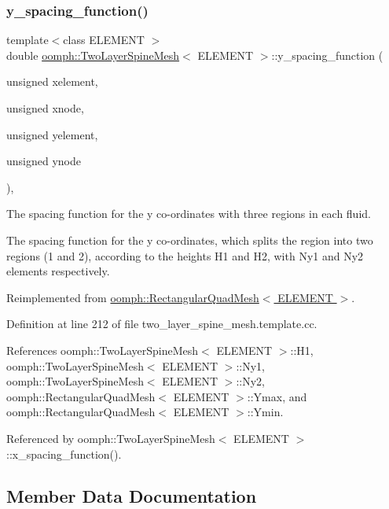 \subsubsection{\texorpdfstring{y\+\_\+spacing\+\_\+function()}{y\_spacing\_function()}}
{\footnotesize\ttfamily template$<$class E\+L\+E\+M\+E\+NT $>$ \\
double \hyperlink{classoomph_1_1TwoLayerSpineMesh}{oomph\+::\+Two\+Layer\+Spine\+Mesh}$<$ E\+L\+E\+M\+E\+NT $>$\+::y\+\_\+spacing\+\_\+function (\begin{DoxyParamCaption}\item[{unsigned}]{xelement,  }\item[{unsigned}]{xnode,  }\item[{unsigned}]{yelement,  }\item[{unsigned}]{ynode }\end{DoxyParamCaption})\hspace{0.3cm}{\ttfamily [protected]}, {\ttfamily [virtual]}}



The spacing function for the y co-\/ordinates with three regions in each fluid. 

The spacing function for the y co-\/ordinates, which splits the region into two regions (1 and 2), according to the heights H1 and H2, with Ny1 and Ny2 elements respectively. 

Reimplemented from \hyperlink{classoomph_1_1RectangularQuadMesh_ae78204de1f176cdf2e819673bd34e78a}{oomph\+::\+Rectangular\+Quad\+Mesh$<$ E\+L\+E\+M\+E\+N\+T $>$}.



Definition at line 212 of file two\+\_\+layer\+\_\+spine\+\_\+mesh.\+template.\+cc.



References oomph\+::\+Two\+Layer\+Spine\+Mesh$<$ E\+L\+E\+M\+E\+N\+T $>$\+::\+H1, oomph\+::\+Two\+Layer\+Spine\+Mesh$<$ E\+L\+E\+M\+E\+N\+T $>$\+::\+Ny1, oomph\+::\+Two\+Layer\+Spine\+Mesh$<$ E\+L\+E\+M\+E\+N\+T $>$\+::\+Ny2, oomph\+::\+Rectangular\+Quad\+Mesh$<$ E\+L\+E\+M\+E\+N\+T $>$\+::\+Ymax, and oomph\+::\+Rectangular\+Quad\+Mesh$<$ E\+L\+E\+M\+E\+N\+T $>$\+::\+Ymin.



Referenced by oomph\+::\+Two\+Layer\+Spine\+Mesh$<$ E\+L\+E\+M\+E\+N\+T $>$\+::x\+\_\+spacing\+\_\+function().



\subsection{Member Data Documentation}
\mbox{\label{classoomph_1_1TwoLayerSpineMesh_ad98f7a291c592042279f0498ea3ec5c9}} 
